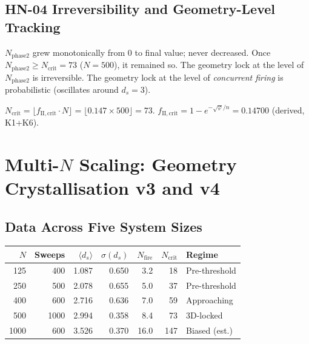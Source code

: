 \documentclass[12pt, a4paper]{article}
\begin{document}
\subsection{HN-04 Irreversibility and Geometry-Level Tracking}

\begin{keybox}[title={HN-04 Geometry Level: 0 Violations (All $N$)}]
$N_{\mathrm{phase2}}$ grew monotonically from 0 to final value; never decreased.
Once $N_{\mathrm{phase2}}\geq N_{\mathrm{crit}}=73$ ($N=500$), it remained so.
The geometry lock at the level of $N_{\mathrm{phase2}}$ is irreversible.
The geometry lock at the level of \emph{concurrent firing} is probabilistic (oscillates around $d_s=3$).

$N_{\mathrm{crit}} = \lfloor f_{\mathrm{II,crit}}\cdot N\rfloor = \lfloor 0.147\times 500\rfloor = 73$.
$f_{\mathrm{II,crit}} = 1-e^{-\sqrt{\varphi}/n} = 0.14700$ (derived, K1+K6).
\end{keybox}

\section{Multi-$N$ Scaling: Geometry Crystallisation v3 and v4}

\subsection{Data Across Five System Sizes}

\begin{center}
\renewcommand{\arraystretch}{1.7}
\begin{tabular}{rrrrrrl}
\toprule
$N$ & Sweeps & $\langle d_s\rangle$ & $\sigma(d_s)$ & $N_{\mathrm{fire}}$ & $N_{\mathrm{crit}}$ & Regime\\
\midrule
125  & 400  & 1.087 & 0.650 & 3.2  & 18  & Pre-threshold\\
250  & 500  & 2.078 & 0.655 & 5.0  & 37  & Pre-threshold\\
400  & 600  & 2.716 & 0.636 & 7.0  & 59  & Approaching\\
500  & 1000 & 2.994 & 0.358 & 8.4  & 73  & 3D-locked\\
1000 & 600  & 3.526 & 0.370 & 16.0 & 147 & Biased (est.)\\
\bottomrule
\end{tabular}
\end{center}
\end{document}
